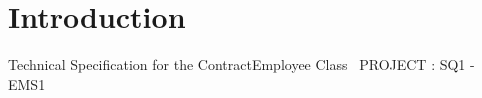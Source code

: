 \hypertarget{index_intro_sec}{}\section{Introduction}\label{index_intro_sec}
Technical Specification for the Contract\+Employee Class~\newline
 P\+R\+O\+J\+E\+C\+T \+: S\+Q1 -\/ E\+M\+S1~\newline
 